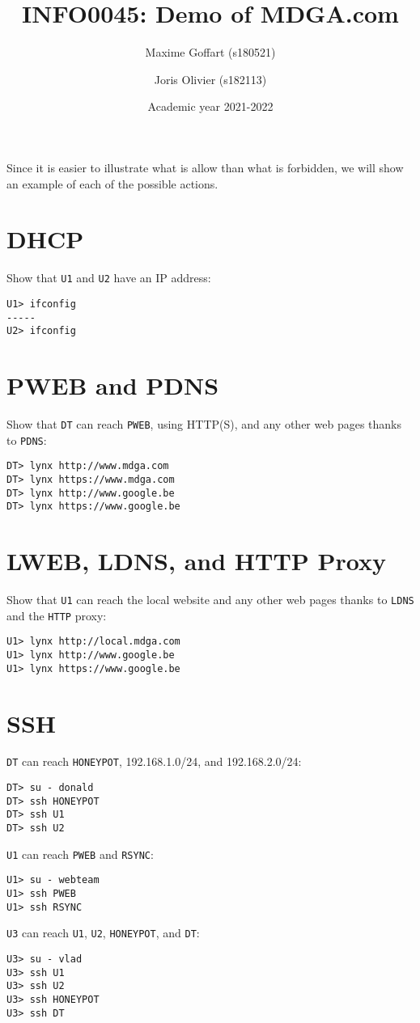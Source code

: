 \documentclass[a4paper, 11pt, oneside]{article}
\title{INFO0045: Demo of MDGA.com}
\author{Maxime Goffart (s180521) \and Joris Olivier  (s182113)}
\date{Academic year 2021-2022}
\begin{document}
\maketitle

\paragraph{}Since it is easier to illustrate what is allow than what is forbidden, we will show an example of each of the possible actions.

\section{DHCP}
\noindent Show that \texttt{U1} and \texttt{U2} have an IP address:
\begin{lstlisting}
U1> ifconfig
-----
U2> ifconfig
\end{lstlisting}

\section{PWEB and PDNS}
\noindent Show that \texttt{DT} can reach \texttt{PWEB}, using HTTP(S), and any other web pages thanks to \texttt{PDNS}:
\begin{lstlisting}
DT> lynx http://www.mdga.com
DT> lynx https://www.mdga.com
DT> lynx http://www.google.be
DT> lynx https://www.google.be
\end{lstlisting}

\section{LWEB, LDNS, and HTTP Proxy}
\noindent Show that \texttt{U1} can reach the local website and any other web pages thanks to \texttt{LDNS} and the \texttt{HTTP} proxy:
\begin{lstlisting}
U1> lynx http://local.mdga.com
U1> lynx http://www.google.be
U1> lynx https://www.google.be
\end{lstlisting}

\section{SSH}
\noindent \texttt{DT} can reach \texttt{HONEYPOT}, 192.168.1.0/24, and 192.168.2.0/24:
\begin{lstlisting}
DT> su - donald
DT> ssh HONEYPOT
DT> ssh U1
DT> ssh U2
\end{lstlisting}
\noindent \texttt{U1} can reach \texttt{PWEB} and \texttt{RSYNC}:
\begin{lstlisting}
U1> su - webteam
U1> ssh PWEB
U1> ssh RSYNC
\end{lstlisting}
\noindent \texttt{U3} can reach \texttt{U1}, \texttt{U2}, \texttt{HONEYPOT}, and \texttt{DT}:
\begin{lstlisting}
U3> su - vlad
U3> ssh U1
U3> ssh U2
U3> ssh HONEYPOT
U3> ssh DT
\end{lstlisting}
\end{document}
